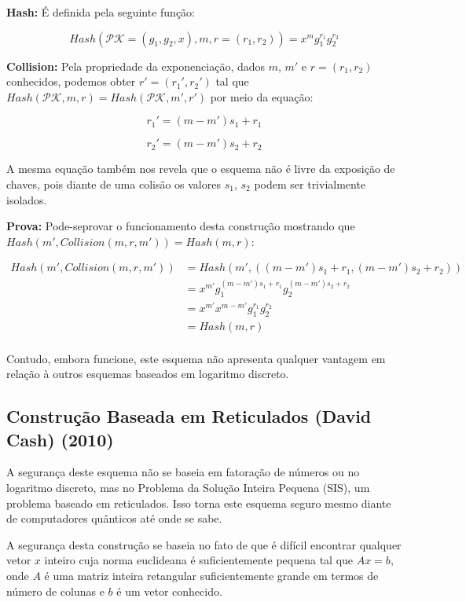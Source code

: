 \documentclass[a4paper]{article}
\begin{document}
\textbf{Hash: } É definida pela seguinte função:

$$
Hash(\mathcal{PK}=(g_1, g_2, x), m, r=(r_1, r_2)) = x^mg_1^{r_1}g_2^{r_2}
$$

\textbf{Collision: } Pela propriedade da exponenciação, dados $m$,
$m'$ e $r=(r_1, r_2)$ conhecidos, podemos obter $r'=(r_1', r_2')$ tal
que $Hash(\mathcal{PK}, m, r) = Hash(\mathcal{PK}, m', r')$ por meio
da equação:

$$
r_1' = (m-m')s_1+r_1
$$

$$
r_2' = (m-m')s_2+r_2
$$

A mesma equação também nos revela que o esquema não é livre da
exposição de chaves, pois diante de uma colisão os valores $s_1$,
$s_2$ podem ser trivialmente isolados.

\textbf{Prova: }Pode-seprovar o funcionamento desta construção
mostrando que $Hash(m', Collision(m, r, m')) = Hash(m, r)$:

\begin{equation}
\begin{split}
  Hash(m', Collision(m, r, m'))
  &= Hash(m', ((m-m')s_1+r_1, (m-m')s_2+r_2))\\
  &= x^{m'}g_1^{(m-m')s_1+r_1}g_2^{(m-m')s_2+r_2}\\
  &= x^{m'}x^{m-m'}g_1^{r_1}g_2^{r_2}\\
  &= Hash(m, r)\\
\end{split}
\end{equation}

Contudo, embora funcione, este esquema não apresenta qualquer vantagem
em relação à outros esquemas baseados em logaritmo discreto.

\subsection{Construção Baseada em Reticulados (David Cash)
  (2010)\cite{reticulado}}

A segurança deste esquema não se baseia em fatoração de números ou no
logaritmo discreto, mas no Problema da Solução Inteira Pequena (SIS),
um problema baseado em reticulados. Isso torna este esquema seguro
mesmo diante de computadores quânticos até onde se sabe.

A segurança desta construção se baseia no fato de que é difícil
encontrar qualquer vetor $x$ inteiro cuja norma euclideana é
suficientemente pequena tal que $Ax = b$, onde $A$ é uma matriz
inteira retangular suficientemente grande em termos de número de
colunas e $b$ é um vetor conhecido.
\end{document}
